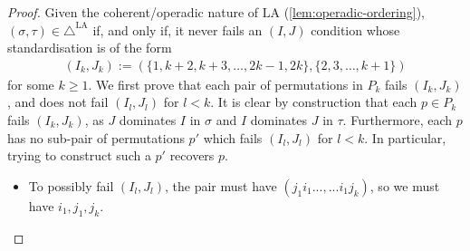 \documentclass{amsart}
\theoremstyle{definition}
\newcommand{\LA}{\mathrm{LA}}
\newcommand{\LAD}{\triangle^{\mathrm{LA}}}
\begin{document}
\begin{proof}

Given the coherent/operadic nature of $\LA$ (\cref{lem:operadic-ordering}), $(\sigma,\tau) \in \LAD$ if, and only if, it never fails an $(I,J)$ condition whose standardisation is of the form 
\begin{align*}
    (I_k,J_k) := (\{1,k+2,k+3,\dots,2k-1,2k\}, \{2,3,\dots,k+1\})
\end{align*}
for some $k\geq 1$.
We first prove that each pair of permutations in $P_k$ fails $(I_k,J_k)$, and does not fail $(I_l,J_l)$ for $l<k$.
It is clear by construction that each $p\in P_k$ fails $(I_k,J_k)$, as $J$ dominates $I$ in $\sigma$ and $I$ dominates $J$ in $\tau$. 
Furthermore, each $p$ has no sub-pair of permutations $p'$ which fails $(I_l,J_l)$ for $l<k$.
In particular, trying to construct such a $p'$ recovers $p$.
\begin{itemize}
    \item To possibly fail $(I_l,J_l)$, the pair must have $(j_1 i_1..., ... i_1j_k)$, so we must have $i_1,j_1,j_k$.
    

\end{itemize}
\end{proof}
\end{document}
